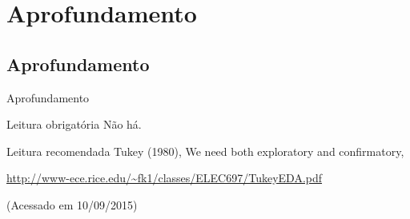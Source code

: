 \documentclass{beamer}
\begin{document}
\section{Aprofundamento}

\subsection{Aprofundamento}

\begin{frame}{Aprofundamento}
  \begin{block}{Leitura obrigatória}
    Não há.
  \end{block}
  \begin{block}{Leitura recomendada}
    \tiny
    Tukey (1980), We need both exploratory and confirmatory,

    {\tiny \url{http://www-ece.rice.edu/~fk1/classes/ELEC697/TukeyEDA.pdf}}

    (Acessado em 10/09/2015)
  \end{block}
\end{frame}
\end{document}

